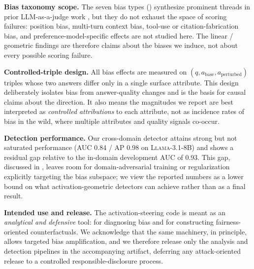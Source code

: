 \documentclass[11pt]{article}
\let\Cref\crtCref
\begin{document}
\textbf{Bias taxonomy scope.} The seven bias types (\Cref{tab:bias_construction}) synthesize prominent threads in prior LLM-as-a-judge work \citep{ye2024justice,koo2024benchmarking,saito2023verbosity,dubois2024length,panickssery2024llm,zheng2023judging,chen2024humans,li2024split}, but they do not exhaust the space of scoring failures: position bias, multi-turn context bias, tool-use or citation-fabrication bias, and preference-model-specific effects are not studied here. The linear / geometric findings are therefore claims about the biases we induce, not about every possible scoring failure.

\textbf{Controlled-triple design.} All bias effects are measured on $(q, a_{\text{base}}, a_{\text{perturbed}})$ triples whose two answers differ only in a single surface attribute. This design deliberately isolates bias from answer-quality changes and is the basis for causal claims about the direction. It also means the magnitudes we report are best interpreted as \emph{controlled attributions} to each attribute, not as incidence rates of bias in the wild, where multiple attributes and quality signals co-occur.

\textbf{Detection performance.} Our cross-domain detector attains strong but not saturated performance (AUC 0.84 / AP 0.98 on \textsc{Llama-3.1-8B}) and shows a residual gap relative to the in-domain development AUC of 0.93. This gap, discussed in \Cref{app:detection_details}, leaves room for domain-adversarial training or regularization explicitly targeting the bias subspace; we view the reported numbers as a lower bound on what activation-geometric detectors can achieve rather than as a final result.

\textbf{Intended use and release.} The activation-steering code is meant as an \emph{analytical and defensive} tool: for diagnosing bias and for constructing fairness-oriented counterfactuals. We acknowledge that the same machinery, in principle, allows targeted bias amplification, and we therefore release only the analysis and detection pipelines in the accompanying artifact, deferring any attack-oriented release to a controlled responsible-disclosure process.


\newpage


\appendix
{}

\end{document}
